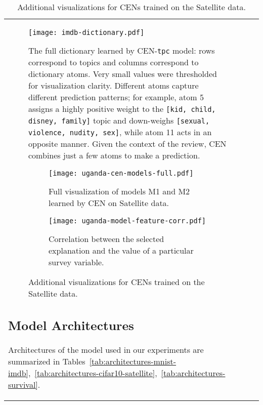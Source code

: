 \documentclass[twoside,11pt]{article}
\begin{document}
\begin{table}[t!]
\begin{tabular}[t]{@{}l|>{\raggedleft\arraybackslash}p{5.1cm}@{}}
\begin{figure}[t!]
\centering
\texttt{[image: imdb-dictionary.pdf]}\caption{The full dictionary learned by CEN-\texttt{tpc} model: rows correspond to topics and columns correspond to dictionary atoms.
Very small values were thresholded for visualization clarity.
Different atoms capture different prediction patterns;
for example, atom 5 assigns a highly positive weight to the \texttt{[kid, child, disney, family]} topic and down-weighs \texttt{[sexual, violence, nudity, sex]}, while atom 11 acts in an opposite manner.
Given the context of the review, CEN combines just a few atoms to make a prediction.}
\label{fig:imdb-dict-tpc}
\end{figure}
 

\begin{figure}[th!]
\begin{subfigure}[b]{\textwidth}
    \centering
    \texttt{[image: uganda-cen-models-full.pdf]}
    \vspace{-4ex}\caption{Full visualization of models M1 and M2 learned by CEN on Satellite data.
    }\label{fig:satellite-models-full}
\end{subfigure}
\begin{subfigure}[b]{\textwidth}
    \centering
    \texttt{[image: uganda-model-feature-corr.pdf]}
    \vspace{-4ex}\caption{Correlation between the selected explanation and the value of a particular survey variable.
    }\label{fig:satellite-models-feature-corr}
\end{subfigure}
\caption{Additional visualizations for CENs trained on the Satellite data.}
\label{fig:satellite-appendix}
\end{figure}
 

\subsection{Model Architectures}
\label{app:architectures}

Architectures of the model used in our experiments are summarized in Tables~\ref{tab:architectures-mnist-imdb},~\ref{tab:architectures-cifar10-satellite},~\ref{tab:architectures-survival}.

\clearpage


\end{tabular}
\end{table}
\end{document}
